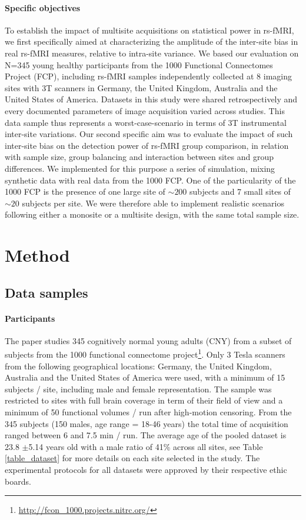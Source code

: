 \documentclass[authoryear]{elsarticle}
\begin{document}
\paragraph{Specific objectives}
To establish the impact of multisite acquisitions on statistical power in rs-fMRI, we first specifically aimed at characterizing the amplitude of the inter-site bias in real rs-fMRI measures, relative to intra-site variance. We based our evaluation on N=345 young healthy participants from the 1000 Functional Connectomes Project (FCP), including rs-fMRI samples independently collected at 8 imaging sites with 3T scanners in Germany, the United Kingdom, Australia and the United States of America. Datasets in this study were shared retrospectively and every documented parameters of image acquisition varied across studies. This data sample thus represents a worst-case-scenario in terms of 3T instrumental inter-site variations. Our second specific aim was to evaluate the impact of such inter-site bias on the detection power of rs-fMRI group comparison, in relation with sample size, group balancing and interaction between sites and group differences. We implemented for this purpose a series of simulation, mixing synthetic data with real data from the 1000 FCP. One of the particularity of the 1000 FCP is the presence of one large site of $\sim200$ subjects and 7 small sites of $\sim20$ subjects per site. We were therefore able to implement realistic scenarios following either a monosite or a multisite design, with the same total sample size.

\section{Method}


\subsection{Data samples}

\paragraph{Participants}
The paper studies 345 cognitively normal young adults (CNY) from a subset of subjects from the 1000 functional connectome project\footnote{\url{http://fcon_1000.projects.nitrc.org/}}. Only 3 Tesla scanners from the following geographical locations: Germany, the United Kingdom, Australia and the United States of America were used, with a minimum of 15 subjects / site, including male and female representation. The sample was restricted to sites with full brain coverage in term of their field of view and a minimum of 50 functional volumes / run after high-motion censoring. From the 345 subjects (150 males, age range = 18-46 years) the total time of acquisition ranged between 6 and 7.5 min / run. The average age of the pooled dataset is 23.8 $\pm$5.14 years old with a male ratio of 41\% across all sites, see Table \ref{table_dataset} for more details on each site selected in the study. The experimental protocols for all datasets were approved by their respective ethic boards.  
\end{document}
